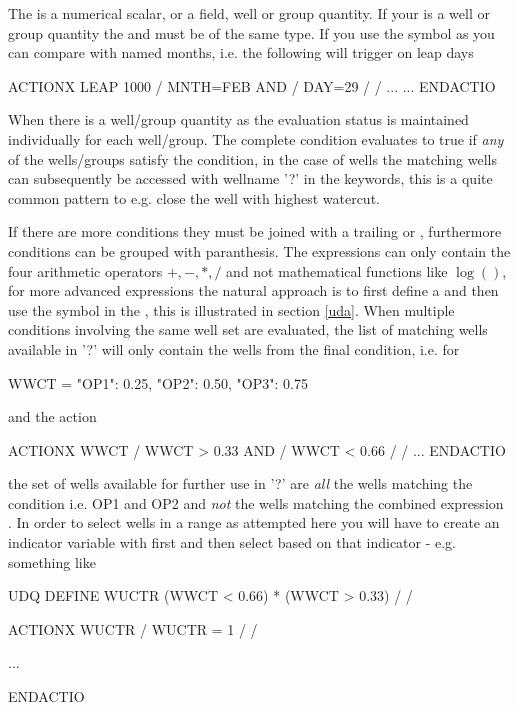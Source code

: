 The  is a numerical scalar, or a field, well or group quantity.
If your  is a well or group quantity the  and
 must be of the same type. If you use the symbol  as
 you can compare with named months, i.e. the following will
trigger on leap days
\begin{deck}
ACTIONX
  LEAP 1000 /
  MNTH=FEB AND /
  DAY=29 /
/
...
...
ENDACTIO
\end{deck}
When there is a well/group quantity as  the evaluation status is
maintained individually for each well/group. The complete condition evaluates to
true if \emph{any} of the wells/groups satisfy the condition, in the case of
wells the matching wells can subsequently be accessed with wellname '?' in the
 keywords, this is a quite common pattern to e.g. close the well
with highest watercut.

If there are more conditions they must be joined with a trailing  or
, furthermore conditions can be grouped with paranthesis. The \actionx{}
expressions can only contain the four arithmetic operators $+,-,*,/$ and not
mathematical functions like $\log()$, for more advanced expressions the natural
approach is to first define a \udq{} and then use the \udq{} symbol in the
\actionx{}, this is illustrated in section \ref{uda}. When multiple conditions
involving the same well set are evaluated, the list of matching wells available
in '?' will only contain the wells from the final condition, i.e. for
\begin{code}
 WWCT = {"OP1": 0.25, "OP2": 0.50, "OP3": 0.75}
\end{code}
and the action
\begin{deck}
ACTIONX
  WWCT /
  WWCT > 0.33 AND /
  WWCT < 0.66 /
/
...
ENDACTIO
\end{deck}
the set of wells available for further use in '?' are \emph{all} the wells
matching the condition  i.e. OP1 and OP2 and \emph{not}
the wells matching the combined expression . In
order to select wells in a range as attempted here you will have to create an
indicator variable with \udq{} first and then select based on that indicator -
e.g. something like
\begin{deck}
UDQ
  DEFINE WUCTR (WWCT < 0.66) * (WWCT > 0.33) /
/

ACTIONX
  WUCTR /
  WUCTR = 1 /
/

...

ENDACTIO
\end{deck}


